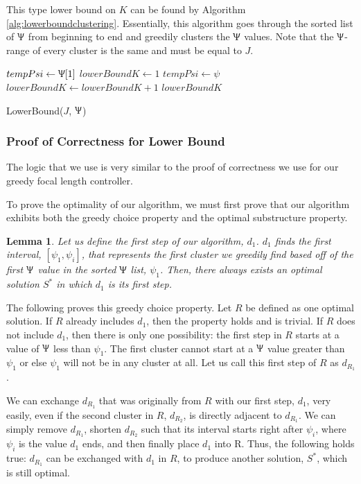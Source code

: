 \documentclass[conference]{IEEEtran}
\theoremstyle{plain}%
\newtheorem{lemma}{Lemma}
\begin{document}
This type lower bound on $K$ can be found by Algorithm \ref{alg:lowerboundclustering}. Essentially, this algorithm goes through the sorted list of $\Uppsi$ from beginning to end and greedily clusters the $\Uppsi$ values. Note that the $\Uppsi$-range of every cluster is the same and must be equal to $J$.

\begin{algorithm}
\begin{algorithmic}[1]
\STATE $tempPsi \leftarrow \Uppsi[1]$
\STATE $lowerBoundK \leftarrow 1$
\FOR{$\psi \in \Uppsi$}
\STATE $tempPsi \leftarrow \psi$
\STATE $lowerBoundK \leftarrow lowerBoundK + 1$
\ENDIF
\ENDFOR
\RETURN $lowerBoundK$
\end{algorithmic}
\caption{LowerBound($J$, $\Uppsi$)} 
\label{alg:lowerboundclustering}
\end{algorithm}

\subsubsection{Proof of Correctness for Lower Bound}
The logic that we use is very similar to the proof of correctness we use for our greedy focal length controller.

To prove the optimality of our algorithm, we must first prove that our algorithm exhibits both the greedy choice property and the optimal substructure property.
\begin{lemma} %
Let us define the first step of our algorithm, $d_1$. $d_1$ finds the first interval, $[\psi_1, \psi_i]$, that represents the first cluster we greedily find based off of the first $\Uppsi$ value in the sorted $\Uppsi$ list, $\psi_1$. Then, there always exists an optimal solution $S^*$ in which $d_1$ is its first step.
\end{lemma}
The following proves this greedy choice property. Let $R$ be defined as one optimal solution. If $R$ already includes $d_1$, then the property holds and is trivial. If $R$ does not include $d_1$, then there is only one possibility: the first step in $R$ starts at a value of $\Uppsi$ less than $\psi_1$. The first cluster cannot start at a $\Uppsi$ value greater than $\psi_1$ or else $\psi_1$ will not be in any cluster at all. Let us call this first step of $R$ as $d_{R_1}$.

We can exchange $d_{R_1}$ that was originally from $R$ with our first step, $d_1$, very easily, even if the second cluster in $R$, $d_{R_2}$, is directly adjacent to $d_{R_1}$. We can simply remove $d_{R_1}$, shorten $d_{R_2}$ such that its interval starts right after $\psi_i$, where $\psi_i$ is the value $d_1$ ends, and then finally place $d_1$ into R. Thus, the following holds true: $d_{R_1}$ can be exchanged with $d_1$ in $R$, to produce another solution, $S^*$, which is still optimal.
\end{document}
